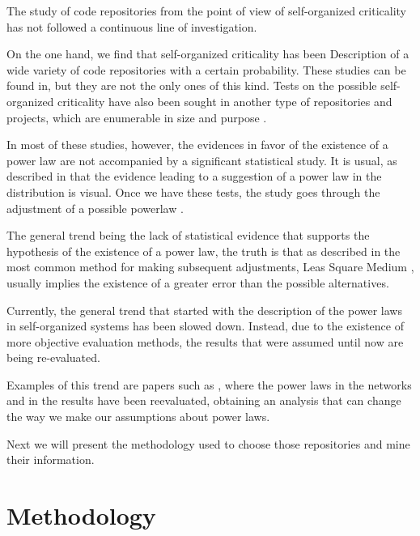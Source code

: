 \documentclass[conference]{IEEEtran}
\begin{document}
The study of code repositories from the point of view of self-organized criticality has not followed a continuous line of investigation.

On the one hand, we find that self-organized criticality has been
Description of a wide variety of code repositories with a certain probability. These studies can be found in\cite{wu2007empirical,gorshenev2004punctuated}, but they are not the only ones of this kind. Tests on the possible self-organized criticality have also been sought in another type of repositories and projects, which are enumerable in size and purpose \cite{Merelo2016:repomining,merelo16:slash,merelo16:self,merelo2017self}.

In most of these studies, however, the evidences in favor of the existence of a power law are not accompanied by a significant statistical study. It is usual, as described in \cite{newman2005power} that the evidence leading to a suggestion of a power law in the distribution is visual. Once we have these tests, the study goes through the adjustment of a possible powerlaw \cite{merelo2017self,arafat2009commit}.

The general trend being the lack of statistical evidence that supports the hypothesis of the existence of a power law, the truth is that as described in \cite{newman2005power, clauset2009power} the most common method for making subsequent adjustments, Leas Square Medium \cite{merelo2017self,arafat2009commit,merelo16:self}, usually implies the existence of a greater error than the possible alternatives.

Currently, the general trend that started with the description of the power laws in self-organized systems has been slowed down. Instead, due to the existence of more objective evaluation methods, the results that were assumed until now are being re-evaluated.

Examples of this trend are papers such as \cite{Holme2019, Broido2019}, where the power laws in the networks and in the results have been reevaluated, obtaining an analysis that can change the way we make our assumptions about power laws.


Next we will present the methodology used to choose those repositories and
mine their information. 




\section{Methodology}
\label{sec:method}
\end{document}
